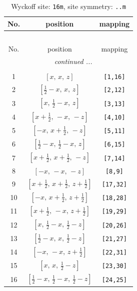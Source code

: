 \documentclass[fleqn,8pt]{jsarticle}
\begin{document}
\renewcommand{\arraystretch}{1.2}
\begin{longtable}{ccc}
\caption{Wyckoff site: {\tt 16m}, site symmetry: {\tt ..m}}
 \\
 \hline \hline
No. & position & mapping \\ \hline \endfirsthead

\multicolumn{2}{l}{\tablename\ \thetable{}} \\
 \hline \hline
No. & position & mapping \\ \hline \endhead

 \hline \hline
\multicolumn{2}{r}{\footnotesize\it continued ...} \\ \endfoot

 \hline \hline
\multicolumn{2}{r}{} \\ \endlastfoot

1 & $\left[ x,\, x,\, z \right]$ & {\tt [1,16]} \\ \hline
2 & $\left[ \frac{1}{2} - x,\, x,\, z \right]$ & {\tt [2,12]} \\ \hline
3 & $\left[ x,\, \frac{1}{2} - x,\, z \right]$ & {\tt [3,13]} \\ \hline
4 & $\left[ x + \frac{1}{2},\, - x,\, - z \right]$ & {\tt [4,10]} \\ \hline
5 & $\left[ - x,\, x + \frac{1}{2},\, - z \right]$ & {\tt [5,11]} \\ \hline
6 & $\left[ \frac{1}{2} - x,\, \frac{1}{2} - x,\, z \right]$ & {\tt [6,15]} \\ \hline
7 & $\left[ x + \frac{1}{2},\, x + \frac{1}{2},\, - z \right]$ & {\tt [7,14]} \\ \hline
8 & $\left[ - x,\, - x,\, - z \right]$ & {\tt [8,9]} \\ \hline
9 & $\left[ x + \frac{1}{2},\, x + \frac{1}{2},\, z + \frac{1}{2} \right]$ & {\tt [17,32]} \\ \hline
10 & $\left[ - x,\, x + \frac{1}{2},\, z + \frac{1}{2} \right]$ & {\tt [18,28]} \\ \hline
11 & $\left[ x + \frac{1}{2},\, - x,\, z + \frac{1}{2} \right]$ & {\tt [19,29]} \\ \hline
12 & $\left[ x,\, \frac{1}{2} - x,\, \frac{1}{2} - z \right]$ & {\tt [20,26]} \\ \hline
13 & $\left[ \frac{1}{2} - x,\, x,\, \frac{1}{2} - z \right]$ & {\tt [21,27]} \\ \hline
14 & $\left[ - x,\, - x,\, z + \frac{1}{2} \right]$ & {\tt [22,31]} \\ \hline
15 & $\left[ x,\, x,\, \frac{1}{2} - z \right]$ & {\tt [23,30]} \\ \hline
16 & $\left[ \frac{1}{2} - x,\, \frac{1}{2} - x,\, \frac{1}{2} - z \right]$ & {\tt [24,25]} \\
\end{longtable}
\end{document}

